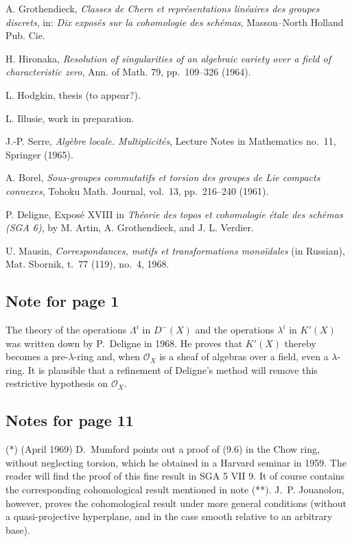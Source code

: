 \begin{enumerate}[label={\textup{[\arabic*]}}]
\item A. Grothendieck, \emph{Classes de Chern et représentations linéaires
des groupes discrets}, in: \emph{Dix exposés sur la cohomologie des
schémas}, Masson--North Holland Pub. Cie.
\item H. Hironaka, \emph{Resolution of singularities of an algebraic
variety over a field of characteristic zero}, Ann. of Math. 79,
pp.~109--326 (1964).
\item L. Hodgkin, thesis (to appear?).
\item L. Illusie, work in preparation.
\item J.-P. Serre, \emph{Algèbre locale. Multiplicités}, Lecture Notes in
Mathematics no.~11, Springer (1965).
\item A. Borel, \emph{Sous-groupes commutatifs et torsion des groupes de Lie
compacts connexes}, Tohoku Math. Journal, vol.~13, pp.~216--240 (1961).
\item[{[16](*)}] P. Deligne, Exposé XVIII in \emph{Théorie des topos et
cohomologie étale des schémas (SGA 6)}, by M. Artin, A. Grothendieck, and
J. L. Verdier.
\item[{[17](*)}] U. Mausin, \emph{Correspondances, motifs et transformations
monoïdales} (in Russian), Mat. Sbornik, t.~77 (119), no.~4, 1968.
\end{enumerate}

\subsection*{Note for page 1}

The theory of the operations $\Lambda^i$ in $D^-(X)$ and the operations
$\lambda^i$ in $K'(X)$ was written down by P.~Deligne in 1968. He proves
that $K'(X)$ thereby becomes a pre-$\lambda$-ring and, when $\mathcal O_X$
is a sheaf of algebras over a field, even a $\lambda$-ring. It is plausible
that a refinement of Deligne's method will remove this restrictive
hypothesis on $\mathcal O_X$.

\subsection*{Notes for page 11}

\noindent(*) (April 1969) D.~Mumford points out a proof of (9.6) in the
Chow ring, without neglecting torsion, which he obtained in a Harvard
seminar in 1959. The reader will find the proof of this fine result in SGA
5 VII 9. It of course contains the corresponding cohomological result
mentioned in note (**). J.~P. Jouanolou, however, proves the cohomological
result under more general conditions (without a quasi-projective
hyperplane, and in the case smooth relative to an arbitrary base).

